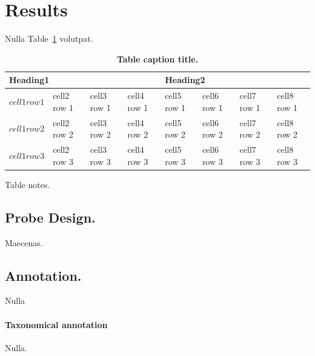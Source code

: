 \documentclass[10pt,letterpaper]{article}
\begin{document}
\section*{Results}
Nulla Table~\ref{table1} volutpat.

\begin{table}[!ht]
\begin{adjustwidth}{-2.25in}{0in} %
\caption{
{\bf Table caption title.}}
\begin{tabular}{|l|l|l|l|l|l|l|l|}
\hline
\multicolumn{4}{|l|}{\bf Heading1} & \multicolumn{4}{|l|}{\bf Heading2}\\ \hline
$cell1 row1$ & cell2 row 1 & cell3 row 1 & cell4 row 1 & cell5 row 1 & cell6 row 1 & cell7 row 1 & cell8 row 1\\ \hline
$cell1 row2$ & cell2 row 2 & cell3 row 2 & cell4 row 2 & cell5 row 2 & cell6 row 2 & cell7 row 2 & cell8 row 2\\ \hline
$cell1 row3$ & cell2 row 3 & cell3 row 3 & cell4 row 3 & cell5 row 3 & cell6 row 3 & cell7 row 3 & cell8 row 3\\ \hline
\end{tabular}
\begin{flushleft} Table notes.
\end{flushleft}
\label{table1}
\end{adjustwidth}
\end{table}


\subsection*{Probe Design.}

Maecenas.

\subsection*{Annotation.}

Nulla
\paragraph{Taxonomical annotation} Nulla.
\end{document}
